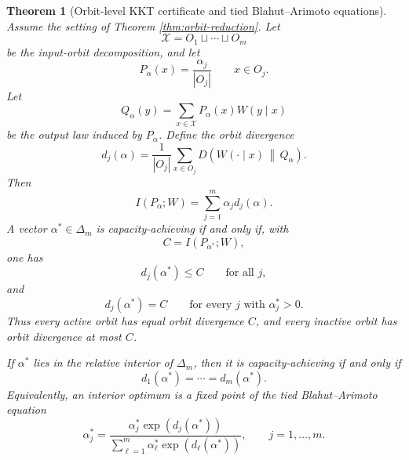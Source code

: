 \documentclass[11pt]{article}
\newtheorem{theorem}{Theorem}
\theoremstyle{definition}
\theoremstyle{remark}
\newcommand{\1}{\mathbf 1}
\begin{document}
\begin{theorem}[Orbit-level KKT certificate and tied Blahut--Arimoto equations]\label{thm:orbit-kkt}
Assume the setting of Theorem \ref{thm:orbit-reduction}.  Let
\[
  \mathcal X=O_1\sqcup\cdots\sqcup O_m
\]
be the input-orbit decomposition, and let
\[
  P_\alpha(x)=\frac{\alpha_j}{|O_j|}\qquad x\in O_j.
\]
Let
\[
  Q_\alpha(y)=\sum_{x\in\mathcal X}P_\alpha(x)W(y\mid x)
\]
be the output law induced by \(P_\alpha\).  Define the orbit divergence
\[
  d_j(\alpha)=\frac1{|O_j|}\sum_{x\in O_j}
    D\left(W(\cdot\mid x)\,\middle\|\,Q_\alpha\right).
\]
Then
\[
  I(P_\alpha;W)=\sum_{j=1}^m \alpha_j d_j(\alpha).
\]
A vector \(\alpha^*\in\Delta_m\) is capacity-achieving if and only if, with
\[
  C=I(P_{\alpha^*};W),
\]
one has
\[
  d_j(\alpha^*)\le C\qquad\text{for all }j,
\]
and
\[
  d_j(\alpha^*)=C\qquad\text{for every }j\text{ with }\alpha_j^*>0.
\]
Thus every active orbit has equal orbit divergence \(C\), and every inactive orbit has orbit divergence at most \(C\).

If \(\alpha^*\) lies in the relative interior of \(\Delta_m\), then it is capacity-achieving if and only if
\[
  d_1(\alpha^*)=\cdots=d_m(\alpha^*).
\]
Equivalently, an interior optimum is a fixed point of the tied Blahut--Arimoto equation
\[
  \alpha_j^*=
  \frac{\alpha_j^*\exp(d_j(\alpha^*))}
       {\sum_{\ell=1}^m\alpha_\ell^*\exp(d_\ell(\alpha^*))},
  \qquad j=1,\ldots,m.
\]
\end{theorem}
\end{document}
